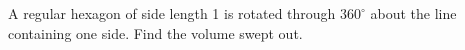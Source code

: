 A regular hexagon of side length 1 is rotated through $360^\circ$ about the line containing one side. Find the volume swept out.
